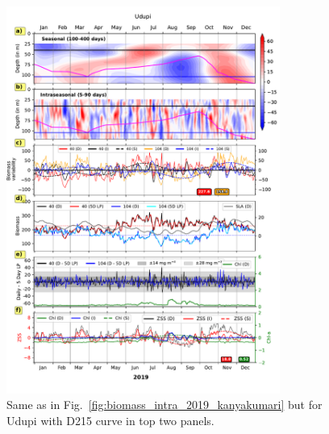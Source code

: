 \documentclass[12pt,a4paper]{article}
\begin{document}
\begin{figure}[htbp]
	\centering
	\includegraphics[width=0.8\textwidth]{./figures/biomass_intra_2019_udupi.pdf} 
	\caption{Same as in Fig.~\ref{fig:biomass_intra_2019_kanyakumari} but for Udupi with D215 curve in top two panels.}		
	\label{fig:biomass_intra_2019_udupi}
\end{figure}
\end{document}
